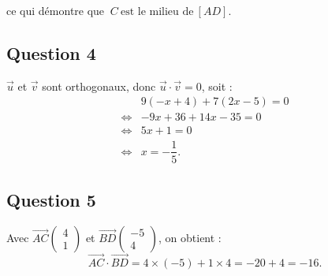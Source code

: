 \documentclass[10pt]{article}
\begin{document}
ce qui démontre que \(\ C \ \text{est le milieu de} \ [AD]\).

\subsection*{Question 4}

\(\vec{u}\) et \(\vec{v}\) sont orthogonaux, donc \(\vec{u} \cdot \vec{v} = 0\), soit :
\begin{align*}
&9(-x + 4) + 7(2x - 5) = 0 \\
\iff &-9x + 36 + 14x - 35 = 0 \\
\iff &5x + 1 = 0 \\
\iff &x = -\dfrac{1}{5}.
\end{align*}

\subsection*{Question 5}

Avec \(\overrightarrow{AC} \begin{pmatrix} 4 \\ 1 \end{pmatrix}\) et \(\overrightarrow{BD} \begin{pmatrix} -5 \\ 4 \end{pmatrix}\), on obtient :
\[
\overrightarrow{AC} \cdot \overrightarrow{BD} = 4 \times (-5) + 1 \times 4 = -20 + 4 = -16.
\]
\end{document}
